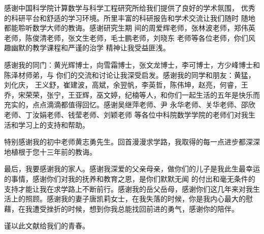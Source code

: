 感谢中国科学院计算数学与科学工程研究所给我们提供了良好的学术氛围，
优秀的科研平台和舒适的学习环境。所里丰富的科研报告和学术交流让我们随时
随地都能聆听数学大师的教诲。感谢研究生期
间的周爱辉老师，张林波老师，郑伟英老师，陈俊清老师，张文生老师，毛士鹏老师，刘晓东
老师等各位老师，你们风趣幽默的教学课程和严谨的治学
精神让我受益匪浅。


感谢我的同门：黄光辉博士，向雪霜博士，张文龙博士，李可博士，方少峰博士和陈泽材师弟，与
你们的交流和讨论让我深受启发。感谢我的同学和朋友：黄猛，刘化庆， 王义舒，崔建波，高斌，余翌帆，李英哲，陈伟坤，赵亮，何睿，王乔，宋荣荣，张宁，王亚辉，巫文婷，纪楠等人，和你们一起生活的五年是快乐而充实的，点点滴滴都值得回忆。感谢吴继萍老师、尹
永华老师、关华老师、邵欣老师、丁汝娟老师、钱莹老师、刘颖老师
等各位中科院数学学院的老师们对我生活和学习上的支持和帮助。

特别感谢我的初中老师黄志勇先生。回首漫漫求学路，我取得的每一点进步都深深地植根于您十三年前的教诲。

最后，我要感谢我的家人。感谢我深爱的父亲母亲，做你们的儿子是我此生最幸运的事情，感谢你们对我的抚养和教育之恩，是你们默默无闻
的付出和毫无条件的支持才能让我在求学路上不断前行。感谢我的岳父岳母，感谢你们这几年来对我生活上的照顾。感谢我的妻子唐凯莉女士，在我失落的时候，你是我内心最大的慰藉，在我遭受挫折的时候，想到你我总能找回前进的勇气，感谢你的陪伴。

谨以此文献给我们的青春。

\cleardoublepage[plain]%

